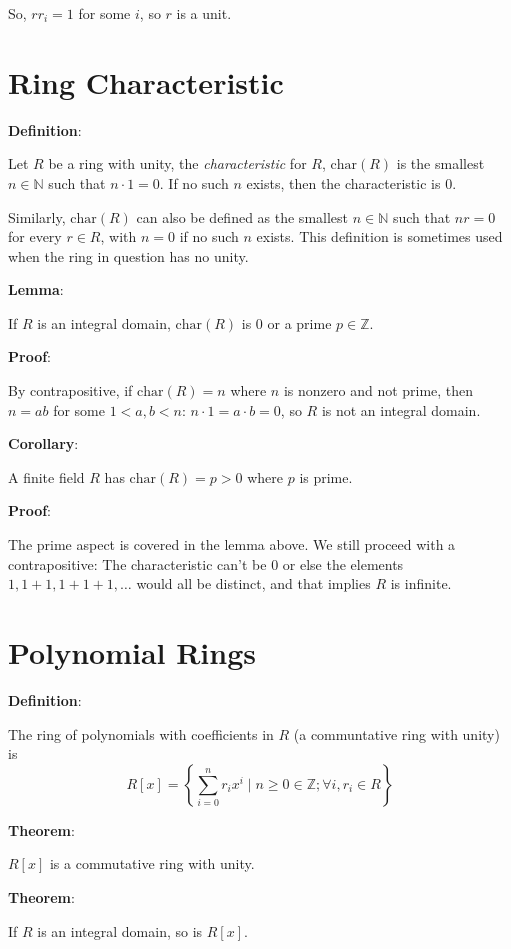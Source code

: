 \documentclass{article}
\begin{document}
\begin{multicols*}{2}
So, $rr_i = 1$ for some $i$, so $r$ is a unit.

\section{Ring Characteristic}

\textbf{Definition}:

Let $R$ be a ring with unity, the \textit{characteristic} for $R$, $\text{char}(R)$ is the smallest $n \in \mathbb{N}$ such that $n \cdot 1 = 0$. If no such $n$ exists, then the characteristic is $0$.

Similarly, $\text{char}(R)$ can also be defined as the smallest $n \in \mathbb{N}$ such that $nr = 0$ for every $r \in R$, with $n=0$ if no such $n$ exists. This definition is sometimes used when the ring in question has no unity.

\textbf{Lemma}:

If $R$ is an integral domain, $\text{char}(R)$ is $0$ or a prime $p \in \mathbb{Z}$.

\textbf{Proof}:

By contrapositive, if $\text{char}(R) = n$ where $n$ is nonzero and not prime, then $n = ab$ for some $1 < a,b < n$: $n \cdot 1 = a \cdot b = 0$, so  $R$ is not an integral domain.

\textbf{Corollary}:

A finite field $R$ has $\text{char}(R) = p > 0$ where $p$ is prime.

\textbf{Proof}:

The prime aspect is covered in the lemma above. We still proceed with a contrapositive: The characteristic can't be 0 or else the elements $1, 1+1,1+1+1,\dots$ would all be distinct, and that implies $R$ is infinite.

\section{Polynomial Rings}

\textbf{Definition}:

The ring of polynomials with coefficients in $R$ (a communtative ring with unity) is \[R[x] = \left\{\sum_{i=0}^{n}r_ix^i\;|\; n \geq 0 \in \mathbb{Z}; \forall i, r_i \in R\right\}\]

\textbf{Theorem}:

$R[x]$ is a commutative ring with unity.

\textbf{Theorem}:

If $R$ is an integral domain, so is $R[x]$.


\end{multicols*}
\end{document}
